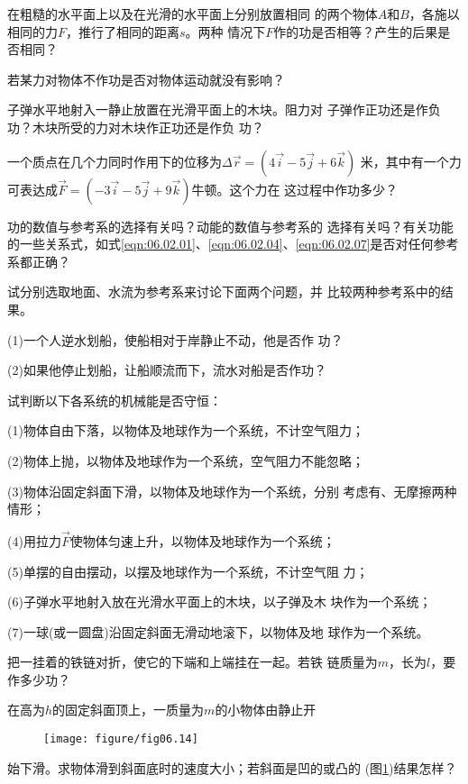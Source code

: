 \documentclass[../outline-of-mechanics.tex]{subfiles}
\begin{document}
\begin{questions}

  \question 在粗糙的水平面上以及在光滑的水平面上分别放置相同
  的两个物体$ A $和$ B $，各施以相同的力$ F $，推行了相同的距离$ s $。两种
  情况下$ F $作的功是否相等？产生的后果是否相同？

  \question 若某力对物体不作功是否对物体运动就没有影响？

  \question 子弹水平地射入一静止放置在光滑平面上的木块。阻力对
  子弹作正功还是作负功？木块所受的力对木块作正功还是作负
  功？

  \question 一个质点在几个力同时作用下的位移为$ \Delta \vec{r} = \left( 4 \vec{i} - 5 \vec{j} + 6 \vec{k} \right) $
  米，其中有一个力可表达成$ \vec{F} = \left( - 3 \vec{i} - 5 \vec{j} + 9 \vec{k} \right) $牛顿。这个力在
  这过程中作功多少？

  \question 功的数值与参考系的选择有关吗？动能的数值与参考系的
  选择有关吗？有关功能的一些关系式，如式\eqref{eqn:06.02.01}、\eqref{eqn:06.02.04}、\eqref{eqn:06.02.07}是否对任何参考系都正确？

  \question 试分别选取地面、水流为参考系来讨论下面两个问题，并
  比较两种参考系中的结果。

  (1)一个人逆水划船，使船相对于岸静止不动，他是否作
  功？

  (2)如果他停止划船，让船顺流而下，流水对船是否作功？

  \question 试判断以下各系统的机械能是否守恒：

  (1)物体自由下落，以物体及地球作为一个系统，不计空气阻力；

  (2)物体上抛，以物体及地球作为一个系统，空气阻力不能忽略；

  (3)物体沿固定斜面下滑，以物体及地球作为一个系统，分别
  考虑有、无摩擦两种情形；

  (4)用拉力$ \vec{F} $使物体匀速上升，以物体及地球作为一个系统；

  (5)单摆的自由摆动，以摆及地球作为一个系统，不计空气阻
  力；

  (6)子弹水平地射入放在光滑水平面上的木块，以子弹及木
  块作为一个系统；

  (7)一球(或一圆盘)沿固定斜面无滑动地滚下，以物体及地
  球作为一个系统。

  \question 把一挂着的铁链对折，使它的下端和上端挂在一起。若铁
  链质量为$ m $，长为$ l $，要作多少功？

  \question 在高为$ h $的固定斜面顶上，一质量为$ m $的小物体由静止开
  \begin{figure}[h]
    \centering
    \texttt{[image: figure/fig06.14]}
    \caption{}
    \label{fig:06.14}
    \vspace{-0.8em}
  \end{figure}
  \clearpage\noindent
  始下滑。求物体滑到斜面底时的速度大小；若斜面是凹的或凸的
  (图\ref{fig:06.14})结果怎样？


\end{questions}
\end{document}
